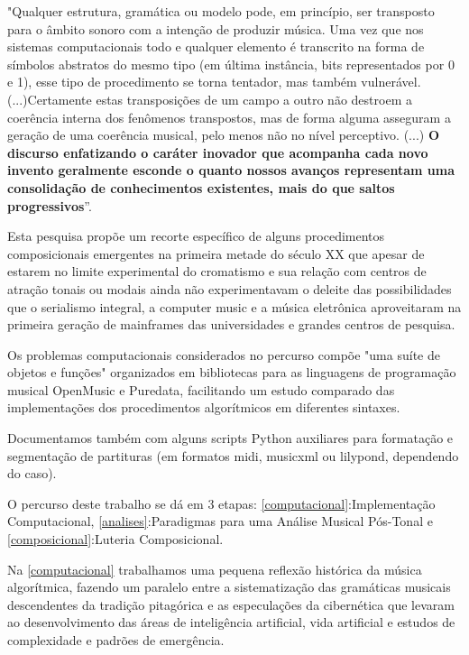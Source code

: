 \documentclass[
	12pt,				%
	openright,			%
	twoside,			%
	a4paper,			%
	english,			%
	french,				%
	spanish,			%
	brazil				%
	]{abntex2}
\begin{document}
\begin{citacao}
"Qualquer estrutura, gramática ou modelo pode, em princípio, ser transposto para o âmbito sonoro com a intenção de produzir música. Uma vez que nos sistemas computacionais todo e qualquer elemento é transcrito na forma de símbolos abstratos do mesmo tipo (em última instância, bits representados por 0 e 1), esse tipo de procedimento se torna tentador, mas também vulnerável.(...)Certamente estas transposições de um campo a outro não destroem a coerência interna dos fenômenos transpostos, mas de forma alguma asseguram a  geração de uma coerência musical, pelo menos não no nível perceptivo.
(...)
\textbf{O discurso enfatizando o caráter inovador que acompanha cada novo invento geralmente esconde o quanto nossos avanços representam uma consolidação  de conhecimentos existentes, mais do que saltos progressivos}”. \cite[p. 151-153, grifo nosso.]{iazzetta2009musica}
\end{citacao}

Esta pesquisa propõe um recorte específico de alguns procedimentos composicionais emergentes na primeira metade do século XX que apesar de estarem no limite experimental do cromatismo e sua relação com centros de atração tonais ou modais ainda não experimentavam o deleite das possibilidades que o serialismo integral, a computer music e a música eletrônica aproveitaram na primeira geração de mainframes das universidades e grandes centros de pesquisa.


Os problemas computacionais considerados no percurso compõe "uma suíte de objetos e funções" organizados em bibliotecas para as linguagens de programação musical OpenMusic e Puredata, facilitando um estudo comparado das implementações dos procedimentos algorítmicos em diferentes sintaxes.

Documentamos também com alguns scripts Python auxiliares para formatação e segmentação de partituras (em formatos midi, musicxml ou lilypond, dependendo do caso).

O percurso deste trabalho se dá em 3 etapas: \autoref{computacional}:Implementação Computacional, \autoref{analises}:Paradigmas para uma Análise Musical Pós-Tonal e \autoref{composicional}:Luteria Composicional.


Na \autoref{computacional} trabalhamos uma pequena reflexão histórica da música algorítmica, fazendo um paralelo entre a sistematização das gramáticas musicais descendentes da tradição pitagórica e as especulações da cibernética que levaram ao desenvolvimento das áreas de inteligência artificial, vida artificial e estudos de complexidade e padrões de emergência.  
\end{document}
